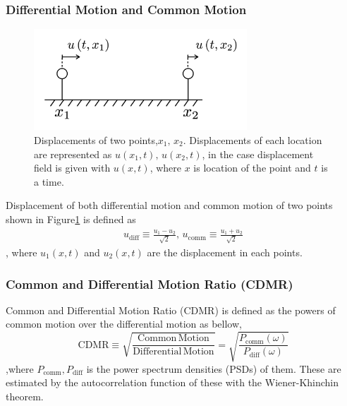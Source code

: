 \documentclass[a4paper,12pt]{book}
\begin{document}
\subsubsection{Differential Motion and Common Motion}
\begin{figure}[H]
  \begin{center}
    \includegraphics[width=8.0cm]{./img_cdmr_arm.png}
  \end{center}
  \caption{Displacements of two points,$x_1,\,x_2$. Displacements of each location are represented as $u(x_1,t),\, u(x_2,t)$, in the case displacement field is given with $u(x,t)$, where $x$ is location of the point and $t$ is a time.
  }\label{img:img_diffcomm}  
\end{figure}

Displacement of both differential motion and common motion of two points shown in Figure\ref{img:img_diffcomm} is defined as
\begin{eqnarray}\label{eq:eq22}
  u_{\mathrm{diff}} \equiv \frac{u_{1}-u_{2}}{\sqrt{2}}, \,
  u_{\mathrm{comm}}  \equiv \frac{u_{1}+u_{2}}{\sqrt{2}}
\end{eqnarray}
, where $u_{1}(x,t)$ and $u_2(x,t)$ are the displacement in each points.



\subsubsection{Common and Differential Motion Ratio (CDMR)}
Common and Differential Motion Ratio (CDMR) is defined as the powers of common motion over the differential motion as bellow,
\begin{equation}
  \mathrm{CDMR} \equiv \sqrt{\frac{\mathrm{Common\,Motion}}{\mathrm{Differential\,Motion}}} = \sqrt{\frac{P_{\mathrm{comm}}(\omega)}{P_{\mathrm{diff}}(\omega)}} \label{eq:eq23}
\end{equation}
,where $P_{\mathrm{comm}},P_{\mathrm{diff}}$ is the power spectrum densities (PSDs) of them. These are estimated by the autocorrelation function of these with the Wiener-Khinchin theorem.
\end{document}
